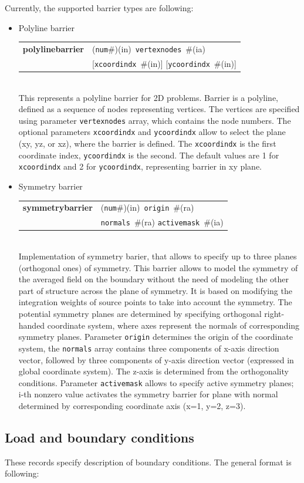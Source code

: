 \documentclass[a4paper]{article}
\makeatletter
\newcommand{\param}[1]{\texttt{#1}} %
\newcommand{\optional}[1]{[#1]} %
\newcommand{\field}[2]{\param{#1}~\#{\tiny(#2)}} %
\newcommand{\optField}[2]{\optional{\field{#1}{#2}}}
\newcommand{\componentNum}{(\param{num}\#){\tiny(in)}} %
\newcommand{\entKeywordInst}[1]{\textbf{#1}} %
\newenvironment{record}[1][]{\begin{tabular}{|ll}}{\end{tabular}\\}
\newcommand{\recentry}[2]{{#1}&{#2}\\}
\newcounter{rcc}
\newenvironment{record}[1][\textwidth]{\setcounter{rcc}{0}\begin{tabular*}{#1}{|ll@{\extracolsep{\fill}}r}}{\end{tabular*}\\}
\newcommand{\recentry}[2]{\ifthenelse{\value{rcc}>0}{&$\backslash$ \\}{\setcounter{rcc}{1}}{#1}&{#2}}
\makeatother
\begin{document}
Currently, the supported barrier types are following:
\begin{itemize}
\item
  Polyline barrier

\begin{record}[0.9\textwidth]
  \recentry{\entKeywordInst{polylinebarrier}}{\componentNum\ \field{vertexnodes}{ia}}
  \recentry{}{\optField{xcoordindx}{in} \optField{ycoordindx}{in}}
\end{record}
This represents a polyline barrier for 2D problems. Barrier is a
polyline, defined as a sequence of nodes representing vertices.
The vertices are specified using parameter \param{vertexnodes} array,
which contains the node numbers. The optional parameters
\param{xcoordindx} and \param{ycoordindx} allow to select the plane
(xy, yz, or xz), where the barrier is defined. The \param{xcoordindx} is the
first coordinate index, \param{ycoordindx} is the second. The default values
are 1 for \param{xcoordindx} and 2 for \param{ycoordindx}, representing barrier in xy plane.
\item Symmetry barrier

\begin{record}[0.9\textwidth]
  \recentry{\entKeywordInst{symmetrybarrier}}{\componentNum\ \field{origin}{ra}}
  \recentry{}{\field{normals}{ra} \field{activemask}{ia}}
\end{record}
Implementation of symmetry barier, that allows to specify up to three planes (orthogonal ones) of symmetry.
This barrier allows to  model the symmetry of the averaged field on the boundary without
the need of modeling the other part of structure across the plane of symmetry.
It is based on modifying the integration weights of source points to take into account
the symmetry.
The potential symmetry planes are determined by specifying orthogonal right-handed coordinate system,
where axes represent the normals of corresponding symmetry planes.
Parameter \param{origin} determines the origin of the coordinate system, the \param{normals} array
contains three components of x-axis direction vector,
followed by three components of y-axis direction vector (expressed in global coordinate system).
The z-axis is determined from the orthogonality conditions.
Parameter \param{activemask} allows to specify active symmetry planes; i-th nonzero value activates the symmetry barrier for plane
with normal determined by corresponding coordinate axis (x=1, y=2, z=3).
\end{itemize}

\subsection{Load and boundary conditions}
\label{_LoadBoundaryInitialConditions}
These records specify description of  boundary conditions. The general format is
following:
\end{document}
